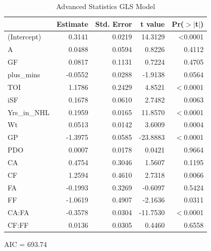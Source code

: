 \documentclass[10pt]{article}
\begin{document}
{{{{\begin{table}[tph]
\caption{\label{tab:advanced-gls}Advanced Statistics GLS Model}
\centering
\begin{threeparttable}
\begin{tabular}[t]{lrrrr}
  \toprule
     & Estimate & Std. Error & t value & Pr($>$$|$t$|$) \\ 
  \midrule
    (Intercept) & 0.3141 & 0.0219 & 14.3129 & <0.0001\\
    A & 0.0488 & 0.0594 & 0.8226 & 0.4112 \\
    GF & 0.0817 & 0.1131 & 0.7224 & 0.4705 \\
    plus\_mins & -0.0552 & 0.0288 & -1.9138 & 0.0564 \\
    TOI & 1.1786 & 0.2429 & 4.8521 & $<$0.0001 \\
    iSF & 0.1678 & 0.0610 & 2.7482 & 0.0063 \\
    Yrs\_in\_NHL & 0.1959 & 0.0165 & 11.8570 & $<$0.0001 \\
    Wt & 0.0513 & 0.0142 & 3.6009 & 0.0004 \\
    GP & -1.3975 & 0.0585 & -23.8883 & $<$0.0001 \\
    PDO & 0.0007 & 0.0178 & 0.0421 & 0.9664 \\
    CA & 0.4754 & 0.3046 & 1.5607 & 0.1195 \\
    CF & 1.2594 & 0.4610 & 2.7318 & 0.0066 \\
    FA & -0.1993 & 0.3269 & -0.6097 & 0.5424 \\
    FF & -1.0619 & 0.4907 & -2.1636 & 0.0311 \\
    CA:FA & -0.3578 & 0.0304 & -11.7530 & $<$0.0001 \\
    CF:FF & 0.0136 & 0.0305 & 0.4460 & 0.6558 \\
   \bottomrule
\end{tabular}
    \begin{tablenotes}
      \item AIC = 693.74
    \end{tablenotes}
  \end{threeparttable}    
\end{table}


}}}}
\end{document}

